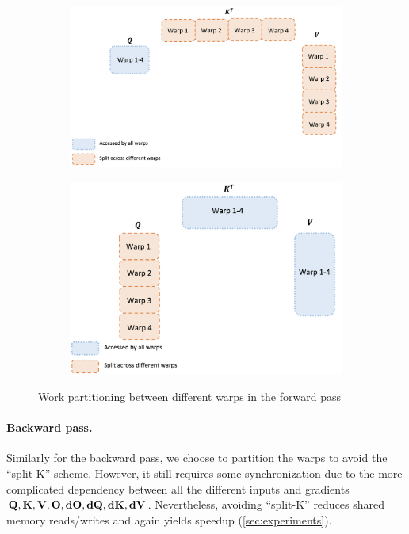\begin{figure}[ht]
  \centering
  \begin{subfigure}{.53\textwidth}
    \centering
    \includegraphics[width=.95\linewidth]{figs/flash_partitioning.png}
    \caption{\sysnameone}
  \end{subfigure}%
  \begin{subfigure}{.47\textwidth}
    \centering
    \includegraphics[width=.95\linewidth]{figs/flash2_partitioning.png}
    \caption{\sysname}
  \end{subfigure}
  \caption{Work partitioning between different warps in the forward pass}
  \label{fig:partitioning}
\end{figure}

\paragraph{Backward pass.}
Similarly for the backward pass, we choose to partition the warps to avoid the
``split-K'' scheme.
However, it still requires some synchronization due to the more complicated
dependency between all the different inputs and gradients
$\mathbf{Q}, \mathbf{K}, \mathbf{V}, \mathbf{O}, \mathbf{dO}, \mathbf{dQ}, \mathbf{dK}, \mathbf{dV}$.
Nevertheless, avoiding ``split-K'' reduces shared memory reads/writes and again
yields speedup (\cref{sec:experiments}).

